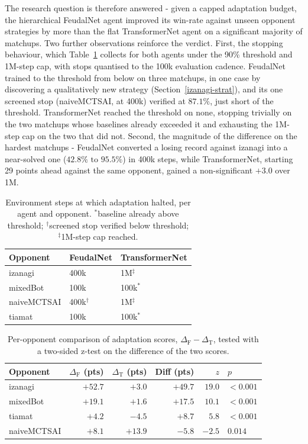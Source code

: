 \documentclass[sigconf,review=false]{acmart}
\begin{document}
The research question is therefore answered - given a capped adaptation budget, the hierarchical FeudalNet agent improved its win-rate against unseen opponent strategies by more than the flat TransformerNet agent on a significant majority of matchups. 
Two further observations reinforce the verdict. 
First, the stopping behaviour, which Table~\ref{tab:steps-to-threshold} collects for both agents under the 90\% threshold and 1M-step cap, with stops quantised to the 100k evaluation cadence.
FeudalNet trained to the threshold from below on three matchups, in one case by discovering a qualitatively new strategy (Section~\ref{izanagi-strat}), and its one screened stop (naiveMCTSAI, at 400k) verified at $87.1\%$, just short of the threshold.
TransformerNet reached the threshold on none, stopping trivially on the two matchups whose baselines already exceeded it and exhausting the 1M-step cap on the two that did not. 
Second, the magnitude of the difference on the hardest matchups - FeudalNet converted a losing record against izanagi into a near-solved one ($42.8\% \text{ to } 95.5\%$) in 400k steps, while TransformerNet, starting 29 points ahead against the same opponent, gained a non-significant $+3.0$ over 1M.

\begin{table}[t]
  \caption{Environment steps at which adaptation halted, per agent and opponent. $^{*}$baseline already above threshold; $^{\dagger}$screened stop verified below threshold; $^{\ddagger}$1M-step cap reached.}
  \label{tab:steps-to-threshold}
  \begin{tabular}{lll}
    \toprule
    Opponent & FeudalNet & TransformerNet \\
    \midrule
    izanagi     & 400k             & 1M$^{\ddagger}$ \\
    mixedBot    & 100k             & 100k$^{*}$      \\
    naiveMCTSAI & 400k$^{\dagger}$ & 1M$^{\ddagger}$ \\
    tiamat      & 100k             & 100k$^{*}$      \\
    \bottomrule
  \end{tabular}
\end{table}

\begin{table}[t]
  \caption{Per-opponent comparison of adaptation scores, $\Delta_{\mathrm{F}} - \Delta_{\mathrm{T}}$, tested with a two-sided z-test on the difference of the two scores.}
  \label{tab:agent-comparison}
  \begin{tabular}{lrrrrl}
    \toprule
    Opponent & $\Delta_{\mathrm{F}}$ (pts) & $\Delta_{\mathrm{T}}$ (pts)
             & Diff (pts) & $z$ & $p$ \\
    \midrule
    izanagi     & $+52.7$ &  $+3.0$ & $+49.7$ & $19.0$ & $<0.001$ \\
    mixedBot    & $+19.1$ &  $+1.6$ & $+17.5$ & $10.1$ & $<0.001$ \\
    tiamat      &  $+4.2$ &  $-4.5$ &  $+8.7$ &  $5.8$ & $<0.001$ \\
    naiveMCTSAI &  $+8.1$ & $+13.9$ &  $-5.8$ & $-2.5$ & $0.014$  \\
    \bottomrule
  \end{tabular}
\end{table}
\end{document}
